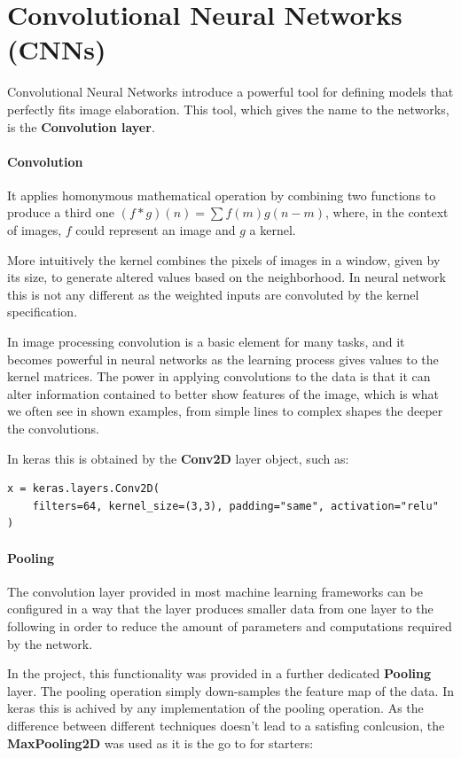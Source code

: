 \newpage


\section{Convolutional Neural Networks (CNNs)}
\label{sec:convolutional-neural-networks-(cnns)}

Convolutional Neural Networks introduce a powerful tool for defining models that perfectly fits image elaboration.
This tool, which gives the name to the networks, is the \textbf{Convolution layer}.

\paragraph{Convolution}
It applies homonymous mathematical operation by combining two functions to produce a third one $(f\ast g)(n) = \sum f(m)g(n-m)$,
where, in the context of images, $f$ could represent an image and $g$ a kernel.

More intuitively the kernel combines the pixels of images in a window, given by its size,
to generate altered values based on the neighborhood.
In neural network this is not any different as the weighted inputs are convoluted by the kernel specification.

In image processing convolution is a basic element for many tasks, and it becomes powerful in neural networks
as the learning process gives values to the kernel matrices.
The power in applying convolutions to the data is that it can alter information contained to better show features of
the image, which is what we often see in shown examples, from simple lines to complex shapes the deeper the convolutions.

In keras this is obtained by the \textbf{Conv2D}\cite{con2d} layer object, such as:
\begin{verbatim}
x = keras.layers.Conv2D(
    filters=64, kernel_size=(3,3), padding="same", activation="relu"
)
\end{verbatim}

\paragraph{Pooling}
The convolution layer provided in most machine learning frameworks can be configured in a way that the layer produces
smaller data from one layer to the following in order to reduce the amount of parameters and computations required by the network.

In the project, this functionality was provided in a further dedicated \textbf{Pooling} layer.
The pooling operation simply down-samples the feature map of the data. In keras this is achived by any implementation
of the pooling operation. As the difference between different techniques doesn't lead to a satisfing
conlcusion\cite{bieder2021comparison}, the \textbf{MaxPooling2D}\cite{maxpooling2d} was used as it is the go to for starters:


